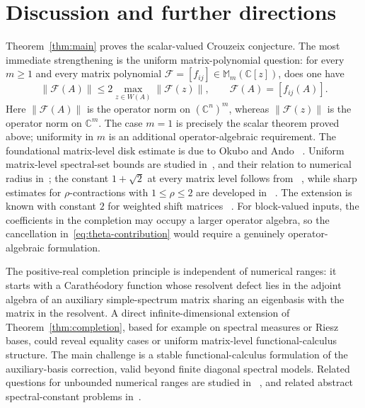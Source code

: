 \documentclass[preprints,article,submit,oneauthor]{Definitions/mdpi}
\theoremstyle{mdpi}
\theoremstyle{definition}
\newcommand{\C}{\mathbb C}
\begin{document}
\section{Discussion and further directions}
\label{sec:outlook}

Theorem~\ref{thm:main} proves the scalar-valued Crouzeix
conjecture.  The most immediate strengthening is the uniform
matrix-polynomial question: for every
$m\geq1$ and every matrix polynomial
$\mathcal F=[f_{ij}]\in\mathbb M_m(\C[z])$, does one have
\begin{equation}
  \lVert\mathcal F(A)\rVert
  \leq2\max_{z\in W(A)}\lVert\mathcal F(z)\rVert,
  \qquad \mathcal F(A)=[f_{ij}(A)].
  \label{eq:uniform-matrix-polynomial-extension}
\end{equation}
Here $\lVert\mathcal F(A)\rVert$ is the operator norm on $(\C^n)^m$,
whereas $\lVert\mathcal F(z)\rVert$ is the operator norm on $\C^m$.
The case $m=1$ is precisely the scalar theorem proved above;
uniformity in $m$ is an additional operator-algebraic requirement.  The
foundational matrix-level disk estimate is due to Okubo and Ando~%
\cite{OkuboAndo1975}.  Uniform matrix-level spectral-set bounds are
studied in~\cite{HartzMcCarthy2026}, and their relation to numerical
radius in~\cite{DavidsonPaulsenWoerdeman2018}; the constant
$1+\sqrt2$ at every matrix level follows from~%
\cite{CrouzeixPalencia2017}, while sharp estimates for
$\rho$-contractions with $1\leq\rho\leq2$ are developed in~%
\cite{SchwenningerDeVriesRho2025}.  The extension is
known with constant $2$ for weighted shift matrices~%
\cite{CrouzeixGreenbaum2025}.  For block-valued inputs, the coefficients
in the completion may occupy a larger operator algebra, so the
cancellation in~\eqref{eq:theta-contribution} would require a genuinely
operator-algebraic formulation.

The positive-real completion principle is independent of numerical
ranges: it starts with a Carath\'eodory function whose resolvent defect
lies in the adjoint algebra of an auxiliary simple-spectrum matrix
sharing an eigenbasis with the matrix in the resolvent.  A direct
infinite-dimensional extension of Theorem~\ref{thm:completion},
based for example on spectral measures or Riesz bases, could reveal
equality cases or uniform matrix-level functional-calculus structure.
The main challenge is a stable functional-calculus formulation of the
auxiliary-basis correction, valid beyond finite diagonal spectral
models.
Related questions for unbounded numerical ranges are studied in~%
\cite{CrouzeixUnbounded2025}, and related abstract spectral-constant
problems in~\cite{SchwenningerDeVries2024,BlazhkoEtAl2025}.
\end{document}
